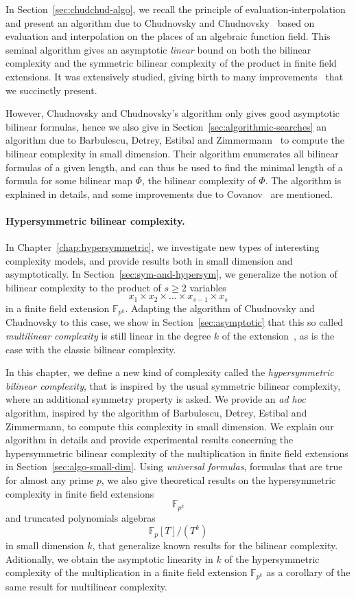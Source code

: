 In Section~\ref{sec:chudchud-algo}, we recall the principle of
evaluation-interpolation and present an algorithm due to Chudnovsky and
Chudnovsky~\cite{CC88} based on evaluation and interpolation on the places of an
algebraic function field. This seminal algorithm gives an asymptotic
\emph{linear} bound on
both the bilinear complexity and the symmetric bilinear complexity of the
product in finite field extensions. It was extensively studied, giving birth to
many improvements~\cite{BR04, CO10, Randriam12} that we succinctly present.

However, Chudnovsky and Chudnovsky's algorithm only gives good asymptotic
bilinear formulas, hence we also
give in Section~\ref{sec:algorithmic-searches} an algorithm due to Barbulescu,
Detrey, Estibal and Zimmermann~\cite{BDEZ12} to compute the bilinear complexity
in small dimension. Their algorithm enumerates all bilinear formulas of a given
length, and can thus be used to find the minimal length of a formula for some
bilinear map $\Phi$, \ie the bilinear complexity of $\Phi$. The
algorithm is explained in details, and some improvements due to
Covanov~\cite{Covanov19} are mentioned.

\paragraph{Hypersymmetric bilinear complexity.}
In Chapter~\ref{chap:hypersymmetric}, we investigate new types of interesting
complexity models, and provide results both in small dimension and
asymptotically. In Section~\ref{sec:sym-and-hypersym}, we generalize the notion
of bilinear complexity to the product of $s\geq2$ variables
\[
  x_1\times x_2\times\dots\times x_{s-1}\times x_s
\]
in a finite field extension $\mathbb{F}_{p^k}$. Adapting the algorithm of
Chudnovsky and Chudnovsky to this case, we show in Section~\ref{sec:asymptotic}
that this so called \emph{multilinear complexity} is still linear in the degree
$k$ of the extension~\cite{RR21}, as is the case with the classic bilinear
complexity.

In this chapter, we define a new kind of complexity called the
\emph{hypersymmetric bilinear complexity}, that is inspired by the usual
symmetric bilinear complexity, where an additional symmetry property is asked.
We provide an \emph{ad hoc} algorithm, inspired by the algorithm of Barbulescu,
Detrey, Estibal and Zimmermann, to compute this complexity in small dimension.
We explain our algorithm in details and provide experimental results concerning
the hypersymmetric bilinear complexity of the multiplication in finite field
extensions in Section~\ref{sec:algo-small-dim}. Using \emph{universal formulas},
\ie formulas that are true for almost any prime $p$, we also give theoretical
results on the hypersymmetric complexity in finite field extensions
\[
  \mathbb{F}_{p^{k}}
\]
and truncated polynomials algebras
\[
  \mathbb{F}_p[T]/(T^k)
\]
in small dimension $k$, that generalize known results for the bilinear
complexity. Aditionally, we obtain the asymptotic linearity in $k$ of the
hypersymmetric complexity of the multiplication in a finite field extension
$\mathbb{F}_{p^k}$ as a corollary of the same result for multilinear
complexity.

